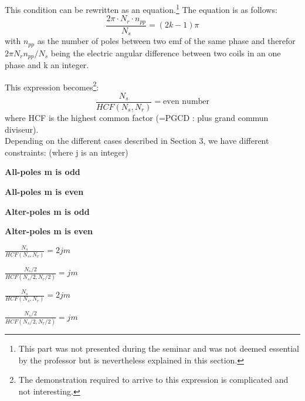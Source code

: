 This condition can be rewritten as an equation.\footnote{This part was not presented during the seminar and was not deemed essential by the professor but is nevertheless explained in this section.} The equation is as follows: $$\frac{2\pi \cdot N_r \cdot n_{pp}}{N_s} = (2k-1)\pi$$
with $n_{pp}$ as the number of poles between two emf of the same phase and therefor $2\pi N_r n_{pp}/N_s$ being the electric angular difference between two coils in an one phase and k an integer.

This expression becomes\footnote{The demonstration required to arrive to this expression is complicated and not interesting.}: $$\frac{N_s}{HCF(N_s , N_r)}=\text{even number}$$
where HCF is the highest common factor (=PGCD : plus grand commun diviseur).\\
Depending on the different cases described in Section 3, we have different constraints: (where j is an integer)

\begin{minipage}[b]{0.22\linewidth}
\textbf{\small{All-poles m is odd}}
\end{minipage}
\hspace{0.2cm}
\begin{minipage}[b]{0.22\linewidth}
\textbf{\small{All-poles m is even}}
\end{minipage}
\hspace{0.35cm}
\begin{minipage}[b]{0.22\linewidth}
\textbf{\small{Alter-poles m is odd}}
\end{minipage}
\hspace{0.3cm}
\begin{minipage}[b]{0.22\linewidth}
\textbf{\small{Alter-poles m is even}}
\end{minipage}

\begin{minipage}[b]{0.2\linewidth}
\begin{center}
$\frac{N_s}{HCF(N_s , N_r)}=2jm$    
\end{center}
\end{minipage}
\hspace{0.4cm}
\begin{minipage}[b]{0.22\linewidth}
\begin{center}
$\frac{N_s/2}{HCF(N_s/2 , N_r/2)}=jm$
\end{center}
\end{minipage}
\hspace{0.4cm}
\begin{minipage}[b]{0.22\linewidth}
\begin{center}
$\frac{N_s}{HCF(N_s , N_r)}=2jm$
\end{center}
\end{minipage}
\hspace{0.4cm}
\begin{minipage}[b]{0.22\linewidth}
\begin{center}
$\frac{N_s/2}{HCF(N_s/2 , N_r/2)}=jm$
\end{center}
\end{minipage}

